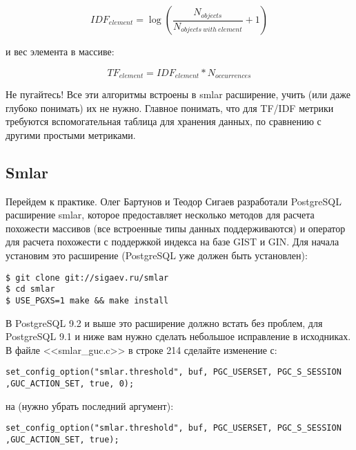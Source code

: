 \begin{equation}
 \label{eq:smlar5}
 IDF_{element} = \log{(\frac{N_{objects}}{N_{objects\ with\ element}} + 1)}
\end{equation}

и вес элемента в массиве:

\begin{equation}
 \label{eq:smlar6}
 TF_{element} = IDF_{element} * N_{occurrences}
\end{equation}

Не пугайтесь! Все эти алгоритмы встроены в smlar расширение, учить (или даже глубоко понимать) их не нужно. Главное понимать, что для TF/IDF метрики требуются вспомогательная таблица для хранения данных, по сравнению с другими простыми метриками.

\subsection{Smlar}

Перейдем к практике. Олег Бартунов и Теодор Сигаев разработали PostgreSQL расширение smlar, которое предоставляет несколько методов для расчета похожести массивов (все встроенные типы данных поддерживаются) и оператор для расчета похожести с поддержкой индекса на базе GIST и GIN. Для начала установим это расширение (PostgreSQL уже должен быть установлен):

\begin{lstlisting}[label=lst:smlar1,caption=Установка smlar]
$ git clone git://sigaev.ru/smlar
$ cd smlar
$ USE_PGXS=1 make && make install
\end{lstlisting}

В PostgreSQL 9.2 и выше это расширение должно встать без проблем, для PostgreSQL 9.1 и ниже вам нужно сделать небольшое исправление в исходниках. В файле <<smlar\_guc.c>> в строке 214 сделайте изменение с:

\begin{lstlisting}[label=lst:smlar2,caption=Фикс для 9.1 и ниже]
set_config_option("smlar.threshold", buf, PGC_USERSET, PGC_S_SESSION ,GUC_ACTION_SET, true, 0);
\end{lstlisting}

на (нужно убрать последний аргумент):

\begin{lstlisting}[label=lst:smlar3,caption=Фикс для 9.1 и ниже]
set_config_option("smlar.threshold", buf, PGC_USERSET, PGC_S_SESSION ,GUC_ACTION_SET, true);
\end{lstlisting}

